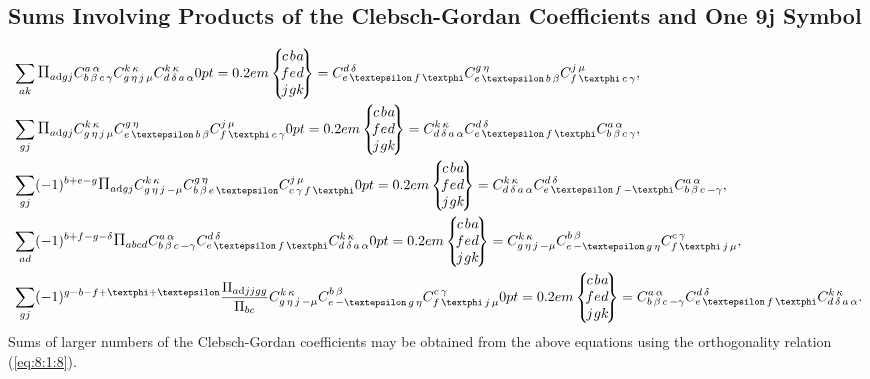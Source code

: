 \subsection{Sums Involving Products of the Clebsch-Gordan Coefficients and One 9j Symbol}\label{sec:8.7.6}
\begin{align}
& \sum_{a k} \Fact{a\dd g j} \clebsch{b}{\beta}{c}{\gamma}{a}{\alpha} \clebsch{g}{\eta}{j}{\mu}{k}{\kappa} \clebsch{d}{\delta}{a}{\alpha}{k}{\kappa}\ninej{c}{b}{a}{f}{e}{d}{j}{g}{k}=\clebsch{e}{\varepsilon}{f}{\varphi}{d}{\delta} \clebsch{e}{\varepsilon}{b}{\beta}{g}{\eta} \clebsch{f}{\varphi}{c}{\gamma}{j}{\mu}, \label{eq:8:7:39}\\
& \sum_{g j} \Fact{a\dd g j} \clebsch{g}{\eta}{j}{\mu}{k}{\kappa} \clebsch{e}{\varepsilon}{b}{\beta}{g}{\eta} \clebsch{f}{\varphi}{c}{\gamma}{j}{\mu}\ninej{c}{b}{a}{f}{e}{d}{j}{g}{k}=\clebsch{d}{\delta}{a}{\alpha}{k}{\kappa} \clebsch{e}{\varepsilon}{f}{\varphi}{d}{\delta} \clebsch{b}{\beta}{c}{\gamma}{a}{\alpha}, \label{eq:8:7:40}\\
& \sum_{g j}(-1)^{b+e-g} \Fact{a\dd g j} \clebsch{g}{\eta}{j}{-\mu}{k}{\kappa} \clebsch{b}{\beta}{e}{\varepsilon}{g}{\eta} \clebsch{c}{\gamma}{f}{\varphi}{j}{\mu}\ninej{c}{b}{a}{f}{e}{d}{j}{g}{k}=\clebsch{d}{\delta}{a}{\alpha}{k}{\kappa} \clebsch{e}{\varepsilon}{f}{-\varphi}{d}{\delta} \clebsch{b}{\beta}{c}{-\gamma}{a}{\alpha}, \label{eq:8:7:41}\\
& \sum_{a d}(-1)^{b+f-g-\delta} \Fact{a b c d} \clebsch{b}{\beta}{c}{-\gamma}{a}{\alpha} \clebsch{e}{\varepsilon}{f}{\varphi}{d}{\delta} \clebsch{d}{\delta}{a}{\alpha}{k}{\kappa}\ninej{c}{b}{a}{f}{e}{d}{j}{g}{k}=\clebsch{g}{\eta}{j}{-\mu}{k}{\kappa} \clebsch{e}{-\varepsilon}{g}{\eta}{b}{\beta} \clebsch{f}{\varphi}{j}{\mu}{c}{\gamma}, \label{eq:8:7:42}\\
& \sum_{g j}(-1)^{g-b-f+\varphi+\varepsilon} \frac{\Fact{a\dd j j g g}}{\Fact{b c}} \clebsch{g}{\eta}{j}{-\mu}{k}{\kappa} \clebsch{e}{-\varepsilon}{g}{\eta}{b}{\beta} \clebsch{f}{\varphi}{j}{\mu}{c}{\gamma}\ninej{c}{b}{a}{f}{e}{d}{j}{g}{k}=\clebsch{b}{\beta}{c}{-\gamma}{a}{\alpha} \clebsch{e}{\varepsilon}{f}{\varphi}{d}{\delta} \clebsch{d}{\delta}{a}{\alpha}{k}{\kappa} . \label{eq:8:7:43}
\end{align}
Sums of larger numbers of the Clebsch-Gordan coefficients may be obtained from the above equations using the orthogonality relation (\eqref{eq:8:1:8}).

